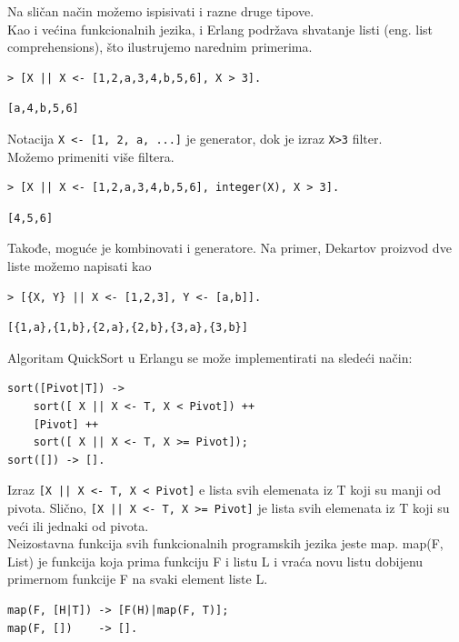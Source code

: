 \documentclass[a4paper]{article}
\begin{document}
{Na sličan način možemo ispisivati i razne druge tipove.\\

Kao i većina funkcionalnih jezika, i Erlang podržava shvatanje listi (eng. list comprehensions), što ilustrujemo narednim primerima.
\begin{verbatim}
> [X || X <- [1,2,a,3,4,b,5,6], X > 3].
\end{verbatim}
\begin{verbatim}
[a,4,b,5,6]
\end{verbatim}
Notacija {\texttt{X <- [1, 2, a, ...]}} je generator, dok je izraz {\texttt{X>3}} filter.\\

Možemo primeniti više filtera.
\begin{verbatim}
> [X || X <- [1,2,a,3,4,b,5,6], integer(X), X > 3].
\end{verbatim}
\begin{verbatim}
[4,5,6]
\end{verbatim}

Takođe, moguće je kombinovati i generatore. Na primer, Dekartov proizvod dve liste možemo napisati kao
\begin{verbatim}
> [{X, Y} || X <- [1,2,3], Y <- [a,b]].
\end{verbatim}
\begin{verbatim}
[{1,a},{1,b},{2,a},{2,b},{3,a},{3,b}]
\end{verbatim}

Algoritam QuickSort u Erlangu se može implementirati na sledeći način:
\begin{verbatim}
sort([Pivot|T]) ->
    sort([ X || X <- T, X < Pivot]) ++
    [Pivot] ++
    sort([ X || X <- T, X >= Pivot]);
sort([]) -> [].
\end{verbatim}
Izraz {\texttt{[X || X <- T, X < Pivot]}} e lista svih elemenata iz T koji su manji od pivota. Slično, {\texttt{[X || X <- T, X >= Pivot]}} je lista svih elemenata iz T koji su veći ili jednaki od pivota.\\

Neizostavna funkcija svih funkcionalnih programskih jezika jeste map.
map(F, List) je funkcija koja prima funkciju F i listu L i vraća novu listu dobijenu primernom funkcije F na svaki element liste L.
\begin{verbatim}
map(F, [H|T]) -> [F(H)|map(F, T)];
map(F, [])    -> [].
\end{verbatim}

}
\end{document}
